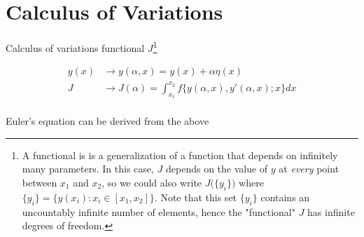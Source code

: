 \newpage
\chapter{Calculus of Variations}
\label{app:calcvar}
Calculus of variations functional $J$\footnote{A functional is is a generalization of a function that depends on infinitely many parameters. In this case, $J$ depends on the value of $y$ at \textit{every} point between $x_1$ and $x_2$, so we could also write $J\big(\{y_i\}\big)$ where $\{y_i\}=\{y(x_i):x_i\in[x_1, x_2]\}$. Note that this set $\{y_i\}$ contains an uncountably infinite number of elements, hence the "functional" $J$ has infinite degrees of freedom.}



\begin{equation}
	\begin{split}
		y(x) & \rightarrow y(\alpha, x) = y(x) + \alpha\eta(x) \\
		J & \rightarrow J(\alpha) = \int_{x_1}^{x_2}f\big\{y(\alpha, x), y'(\alpha, x); x\big\}dx \\
	\end{split}
\end{equation}


Euler's equation can be derived from the above



\eqn{}



